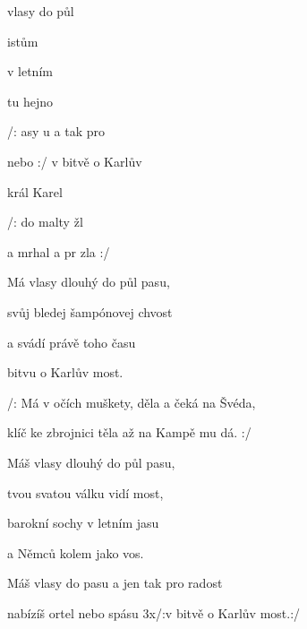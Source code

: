 

\zs
{} vlasy  do půl 

istům  

  v letním 

 tu  hejno 

/: asy u a  tak pro 

  nebo  :/ v bitvě o Karlův 
\ks

\zr
{}  král Karel 

  

/:  do malty žl

a mrhal  a pr  zla :/
\kr

\zs
Má vlasy dlouhý do půl pasu,

svůj bledej šampónovej chvost

a svádí právě toho času

bitvu o Karlův most.


/: Má v očích muškety, děla a čeká na Švéda,

klíč ke zbrojnici těla až na Kampě mu dá. :/
\ks


\zr \kr

\zs

Máš vlasy dlouhý do půl pasu,

tvou svatou válku vidí most,

barokní sochy v letním jasu

a Němců kolem jako vos.



Máš vlasy do pasu a jen tak pro radost

nabízíš ortel nebo spásu 3x/:v bitvě o Karlův most.:/
\ks

\kp





